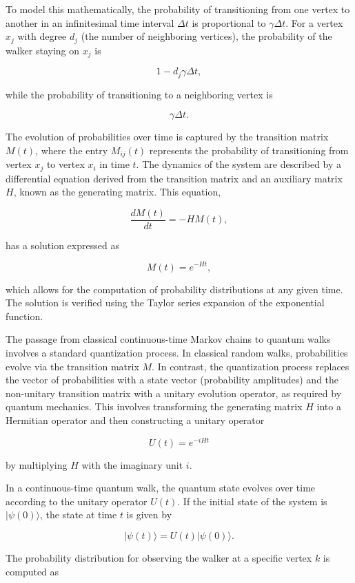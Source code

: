 \documentclass[11pt]{article}
\theoremstyle{definition}
\begin{document}
To model this mathematically, the probability of transitioning from one vertex to another in an infinitesimal time interval \( \Delta t \) is proportional to \( \gamma \Delta t \). For a vertex \( x_j \) with degree \( d_j \) (the number of neighboring vertices), the probability of the walker staying on \( x_j \) is 

\[
1 - d_j \gamma \Delta t,
\]

while the probability of transitioning to a neighboring vertex is 

\[
\gamma \Delta t.
\]

The evolution of probabilities over time is captured by the transition matrix \( M(t) \), where the entry \( M_{ij}(t) \) represents the probability of transitioning from vertex \( x_j \) to vertex \( x_i \) in time \( t \). The dynamics of the system are described by a differential equation derived from the transition matrix and an auxiliary matrix \( H \), known as the generating matrix. This equation, 

\[
\frac{dM(t)}{dt} = -H M(t),
\]

has a solution expressed as 

\[
M(t) = e^{-Ht},
\]

which allows for the computation of probability distributions at any given time. The solution is verified using the Taylor series expansion of the exponential function.

The passage from classical continuous-time Markov chains to quantum walks involves a standard quantization process. In classical random walks, probabilities evolve via the transition matrix \( M \). In contrast, the quantization process replaces the vector of probabilities with a state vector (probability amplitudes) and the non-unitary transition matrix with a unitary evolution operator, as required by quantum mechanics. This involves transforming the generating matrix \( H \) into a Hermitian operator and then constructing a unitary operator 

\[
U(t) = e^{-iHt}
\]

by multiplying \( H \) with the imaginary unit \( i \).

In a continuous-time quantum walk, the quantum state evolves over time according to the unitary operator \( U(t) \). If the initial state of the system is \( |\psi(0)\rangle \), the state at time \( t \) is given by 

\[
|\psi(t)\rangle = U(t) |\psi(0)\rangle.
\]

The probability distribution for observing the walker at a specific vertex \( k \) is computed as 
\end{document}
